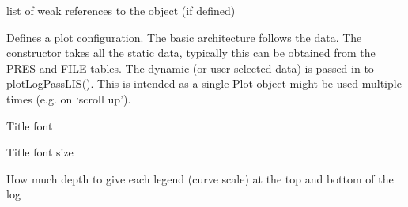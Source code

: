 \documentclass[letterpaper,10pt,english]{sphinxmanual}
\begin{document}
\begin{fulllineitems}
\begin{fulllineitems}
\end{fulllineitems}


\begin{fulllineitems}
\label{\detokenize{ref/util/plot/Plot:TotalDepth.util.plot.Plot.PlotRoll.__weakref__}}
list of weak references to the object (if defined)

\end{fulllineitems}


\end{fulllineitems}


\begin{fulllineitems}
\label{\detokenize{ref/util/plot/Plot:TotalDepth.util.plot.Plot.Plot}}
Defines a plot configuration. The basic architecture follows the
data. The constructor takes all the static data, typically this can
be obtained from the PRES and FILE tables.
The dynamic (or user selected data) is passed in to plotLogPassLIS(). This is
intended as a single Plot object might be used multiple times (e.g. on
‘scroll up’).

\begin{fulllineitems}
\label{\detokenize{ref/util/plot/Plot:TotalDepth.util.plot.Plot.Plot.TITLE_FONT_FAMILY}}
Title font

\end{fulllineitems}


\begin{fulllineitems}
\label{\detokenize{ref/util/plot/Plot:TotalDepth.util.plot.Plot.Plot.TITLE_FONT_SIZE}}
Title font size

\end{fulllineitems}


\begin{fulllineitems}
\label{\detokenize{ref/util/plot/Plot:TotalDepth.util.plot.Plot.Plot.LEGEND_DEPTH_PER_CURVE}}
How much depth to give each legend (curve scale) at the top and
bottom of the log


\end{fulllineitems}
\end{fulllineitems}
\end{document}

